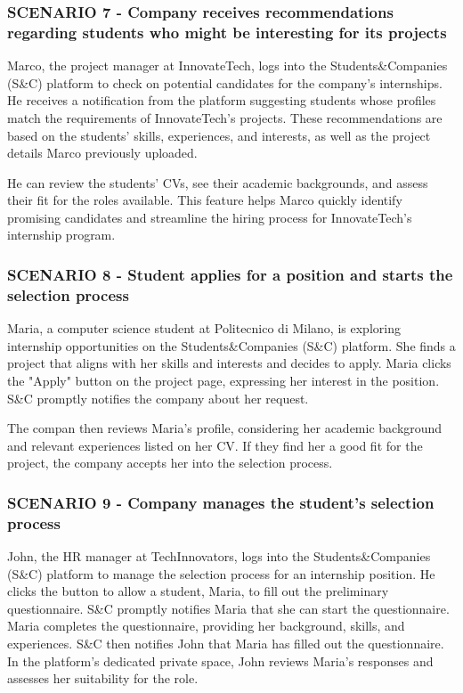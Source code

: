 \subsubsection{SCENARIO 7 - Company receives recommendations regarding students who might be interesting for its projects}
Marco, the project manager at InnovateTech, logs into the Students\&Companies (S\&C) platform
to check on potential candidates for the company’s internships. He receives a notification
from the platform suggesting students whose profiles match the requirements of InnovateTech’s projects.
These recommendations are based on the students’ skills, experiences, and interests, as well as
the project details Marco previously uploaded.

He can review the students’ CVs, see their academic
backgrounds, and assess their fit for the roles available. This feature helps Marco quickly identify
 promising candidates and streamline the hiring process for InnovateTech’s internship program.
\subsubsection{SCENARIO 8 - Student applies for a position and starts the selection process}
Maria, a computer science student at Politecnico di Milano, is exploring internship opportunities
on the Students\&Companies (S\&C) platform. She finds a project that aligns with her skills and
interests and decides to apply. Maria clicks the "Apply" button on the project page, expressing
her interest in the position. S\&C promptly notifies the company about her request.

The compan then reviews Maria’s profile, considering her academic background and relevant
experiences listed on her CV. If they find her a good fit for the project, the company accepts
her into the selection process.
\subsubsection{SCENARIO 9 - Company manages the student's selection process}
John, the HR manager at TechInnovators, logs into the Students\&Companies (S\&C) platform
to manage the selection process for an internship position. He clicks the button to allow a student,
Maria, to fill out the preliminary questionnaire. S\&C promptly notifies Maria that she can start
the questionnaire. Maria completes the questionnaire, providing her background, skills, and experiences.
S\&C then notifies John that Maria has filled out the questionnaire. In the platform’s dedicated
private space, John reviews Maria’s responses and assesses her suitability for the role.

